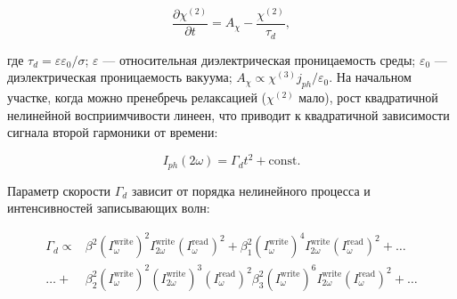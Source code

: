 
\begin{equation}\label{eq:chi2_growth}
	\dfrac{\partial \chi^{(2)}}{\partial t} = A_{\chi} - \frac{\chi^{(2)}}{\tau_d},
\end{equation}

где $\tau_d = \varepsilon\varepsilon_0/\sigma$; $\varepsilon$ — относительная диэлектрическая проницаемость среды; $\varepsilon_0$ — диэлектрическая проницаемость вакуума; $A_{\chi} \propto \chi^{(3)} j_{ph} / \varepsilon_0$. На начальном участке, когда можно пренебречь релаксацией ($\chi^{(2)}$ мало), рост квадратичной нелинейной восприимчивости линеен, что приводит к квадратичной зависимости сигнала второй гармоники от времени:

\begin{equation}\label{eq:shg_quadratic}
	I_{ph}(2\omega) = \Gamma_d t^2 + \text{const}.
\end{equation}


Параметр скорости $\Gamma_d$ зависит от порядка нелинейного процесса и интенсивностей записывающих волн:

\begin{align}\label{eq:dianov_gamma}
	\Gamma_d \propto &\beta^2 (I_\omega^{\text{write}})^2 I_{2\omega}^{\text{write}} (I_\omega^{\text{read}})^2
	+ \beta_1^2 (I_\omega^{\text{write}})^4 I_{2\omega}^{\text{write}} (I_\omega^{\text{read}})^2+\ldots\\
	\ldots+ &\beta_2^2 (I_\omega^{\text{write}})^2 (I_{2\omega}^{\text{write}})^3 (I_\omega^{\text{read}})^2
	 \beta_3^2 (I_\omega^{\text{write}})^6 I_{2\omega}^{\text{write}} (I_\omega^{\text{read}})^2
	+ \ldots
\end{align}

